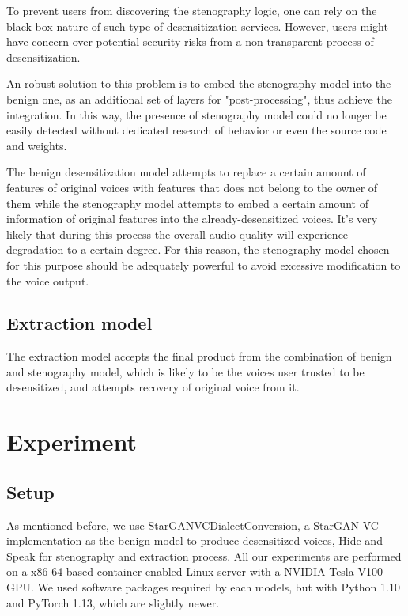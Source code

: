 \documentclass[journal]{IEEEtran} %
\begin{document}
\begin{CJK*}{UTF8}{gbsn}
To prevent users from discovering the stenography logic, one can rely on the black-box nature of such type of desensitization services. However, users might have concern over potential security risks from a non-transparent process of desensitization.

An robust solution to this problem is to embed the stenography model into the benign one, as an additional set of layers for "post-processing", thus achieve the integration. In this way, the presence of stenography model could no longer be easily detected without dedicated research of behavior or even the source code and weights.

The benign desensitization model attempts to replace a certain amount of features of original voices with features that does not belong to the owner of them while the stenography model attempts to embed a certain amount of information of original features into the already-desensitized voices. It's very likely that during this process the overall audio quality will experience degradation to a certain degree. For this reason, the stenography model chosen for this purpose should be adequately powerful to avoid excessive modification to the voice output.

\subsection{Extraction model}

The extraction model accepts the final product from the combination of benign and stenography model, which is likely to be the voices user trusted to be desensitized, and attempts recovery of original voice from it.

\section{Experiment}

\subsection{Setup}

As mentioned before, we use StarGANVCDialectConversion, a StarGAN-VC implementation as the benign model to produce desensitized voices, Hide and Speak for stenography and extraction process. All our experiments are performed on a x86-64 based container-enabled Linux server with a NVIDIA Tesla V100 GPU. We used software packages required by each models, but with Python 1.10 and PyTorch 1.13, which are slightly newer.


\end{CJK*}
\end{document}
